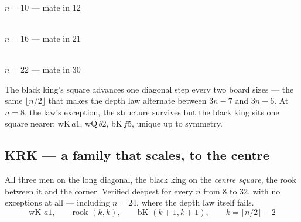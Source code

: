\documentclass[11pt]{article}
\begin{document}
\begin{center}
\begin{minipage}{0.31\textwidth}\centering
  \\[1.5mm]
  {\small $n=10$ --- mate in 12}
\end{minipage}\hfill
\begin{minipage}{0.31\textwidth}\centering
  \\[1.5mm]
  {\small $n=16$ --- mate in 21}
\end{minipage}\hfill
\begin{minipage}{0.31\textwidth}\centering
  \\[1.5mm]
  {\small $n=22$ --- mate in 30}
\end{minipage}
\end{center}

\medskip

\noindent
The black king's square advances one diagonal step every two board sizes ---
the same $\lfloor n/2 \rfloor$ that makes the depth law alternate between
$3n-7$ and $3n-6$. At $n=8$, the law's exception, the structure survives but
the black king sits one square nearer: wK\,$a1$, wQ\,$b2$, bK\,$f5$, unique up
to symmetry.

\subsection{KRK --- a family that scales, to the centre}\label{sub:krk-family}

All three men on the long diagonal, the black king on the \emph{centre square},
the rook between it and the corner. Verified deepest for every $n$ from 8 to 32,
with no exceptions at all --- including $n=24$, where the depth law itself fails.
\[ \text{wK }a1,\qquad \text{rook }(k,k),\qquad \text{bK }(k{+}1,k{+}1),
   \qquad k = \lceil n/2 \rceil - 2 \]
\end{document}
